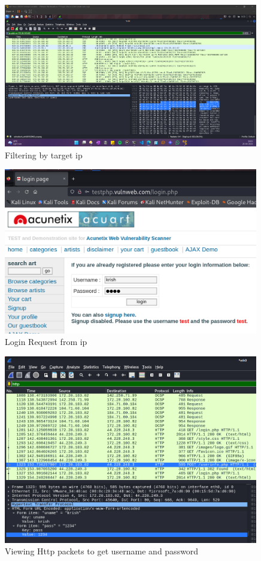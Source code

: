 \documentclass[11pt]{article}
\begin{document}
\begin{figure}[H]
    \centering
    \includegraphics[width=0.99\textwidth]{assignment 8 (1).png}
    \caption{Filtering by target ip}
\end{figure}
\begin{figure}[H]
    \centering
    \includegraphics[width=0.99\textwidth]{assignment 8 (3).png}
    \caption{Login Request from ip}
\end{figure}

\begin{figure}[H]
    \centering
    \includegraphics[width=0.99\textwidth]{assignment 8 (2).png}
    \caption{Viewing Http packets to get username and password}
\end{figure}
\end{document}
